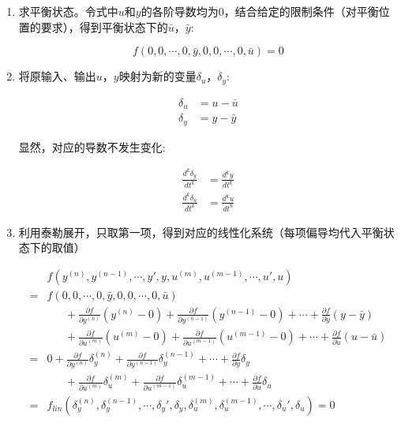 \begin{enumerate}
	\item 求平衡状态。令式中$u$和$y$的各阶导数均为0，结合给定的限制条件（对平衡位置的要求），得到平衡状态下的$\bar{u}$，$\bar{y}$:
	
	\begin{equation*}
		f(0,0,\cdots,0,\bar{y},0,0,\cdots,0,\bar{u})=0
	\end{equation*}

	\item 将原输入、输出$u$，$y$映射为新的变量$\delta_u$，$\delta_y$:
	
	\begin{align*}
		\delta_u&=u-\bar{u}\\
		\delta_y&=y-\bar{y}
	\end{align*}

	显然，对应的导数不发生变化:

	\begin{align*}
		\frac{d^k\delta_y}{dt^k}&=\frac{d^ky}{dt^k}\\
		\frac{d^k\delta_u}{dt^k}&=\frac{d^ku}{dt^k}
	\end{align*}

	\item 利用泰勒展开，只取第一项，得到对应的线性化系统（每项偏导均代入平衡状态下的取值）
	
	\begin{align*}
		&f(y^{(n)},y^{(n-1)},\cdots,y',y,u^{(m)},u^{(m-1)},\cdots,u',u)\\
		=&f(0,0,\cdots,0,\bar{y},0,0,\cdots,0,\bar{u})\\
		&\phantom{aaa}+\frac{\partial f}{\partial y^{(n)}}(y^{(n)}-0)+\frac{\partial f}{\partial y^{(n-1)}}(y^{(n-1)}-0)+\cdots+\frac{\partial f}{\partial y}(y-\bar{y})\\
		&\phantom{aaa}+\frac{\partial f}{\partial u^{(m)}}(u^{(m)}-0)+\frac{\partial f}{\partial u^{(m-1)}}(u^{(m-1)}-0)+\cdots+\frac{\partial f}{\partial u}(u-\bar{u})\\
		=&0+\frac{\partial f}{\partial y^{(n)}}\delta_y^{(n)}+\frac{\partial f}{\partial y^{(n-1)}}\delta_y^{(n-1)}+\cdots+\frac{\partial f}{\partial y}\delta_y\\
		&\phantom{aaa}+\frac{\partial f}{\partial u^{(m)}}\delta_u^{(m)}+\frac{\partial f}{\partial u^{(m-1)}}\delta_u^{(m-1)}+\cdots+\frac{\partial f}{\partial u}\delta_u\\
		=&f_{lin}(\delta_y^{(n)},\delta_y^{(n-1)},\cdots,\delta_y',\delta_y,\delta_u^{(m)},\delta_u^{(m-1)},\cdots,\delta_u',\delta_u)=0\\
	\end{align*}
\end{enumerate}




